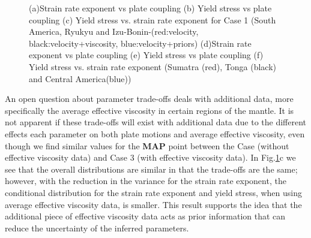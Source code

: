 \documentclass[12pt]{article}
\begin{document}
\begin{figure}[H]
{}
\hspace{0.1cm}
\caption{(a)Strain rate exponent vs plate coupling (b) Yield stress vs plate coupling (c) Yield stress vs. strain rate exponent for Case 1 (South America, Ryukyu and Izu-Bonin-(red:velocity, black:velocity+viscosity, blue:velocity+priors) (d)Strain rate exponent vs plate coupling (e) Yield stress vs plate coupling (f) Yield stress vs. strain rate exponent  (Sumatra (red), Tonga (black) and Central America(blue))}
\label{fig:distrib}
\end{figure}


An open question about parameter trade-offs deals with additional data, more specifically the average effective viscosity in certain regions of the mantle. 
It is not apparent if these trade-offs will exist with additional data due to the different effects each parameter on both plate motions and average effective viscosity, even though we find similar values for the \textbf{MAP} point between the Case  (without effective viscosity data) and Case 3 (with effective viscosity data). In Fig.\ref{fig:distrib}c we see that the overall distributions are similar in that the trade-offs are the same; however, with the reduction in the variance for the strain rate exponent, the conditional distribution for the strain rate exponent and yield stress, when using average effective viscosity data, is smaller. This result supports the idea that the additional piece of effective viscosity data acts as prior information that can reduce the uncertainty of the inferred parameters. 
\end{document}
